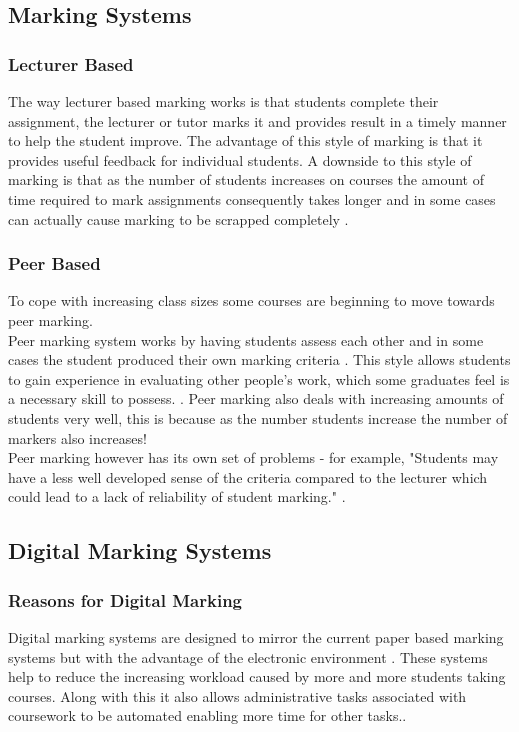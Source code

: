 \documentclass[12pt]{article}  %
\begin{document}
\subsection{Marking Systems}

\subsubsection{Lecturer Based}
The way lecturer based marking works is that students complete their assignment, the lecturer or tutor marks it and provides result in a timely manner to help the student improve. The advantage of this style of marking is that it provides useful feedback for individual students.
A downside to this style of marking is that as the number of students increases on courses the amount of time required to mark assignments consequently takes longer and in some cases can actually cause marking to be scrapped completely \cite{brown_assessment_1999}. 


\subsubsection{Peer Based}
To cope with increasing class sizes some courses are beginning to move towards peer marking.\\
Peer marking system works by having students assess each other and in some cases  the student produced their own marking criteria \cite{orsmond_use_2000}. This style allows  students to gain experience in evaluating other people's work, which some graduates feel is a necessary skill to possess. \cite{langan_insights_????}. Peer marking also deals with increasing amounts of students very well, this is because as the number students increase the number of markers also increases!  \\
Peer marking however has its own set of problems - for example, "Students may have a less well developed sense of the criteria compared to the lecturer which could lead to a lack of reliability of student marking." \cite{orsmond_use_2000}. 


\newpage
\subsection{Digital Marking Systems}

\subsubsection{Reasons for Digital Marking}
Digital marking systems are designed to mirror the current paper based marking systems but with the advantage of the electronic environment \cite{heinrich_online_2003}. These systems help to reduce the increasing workload caused by more and more students taking courses. Along with this it also allows administrative tasks associated with coursework to be automated enabling more time for other tasks.\cite{joy_effective_1998}.
\end{document}
